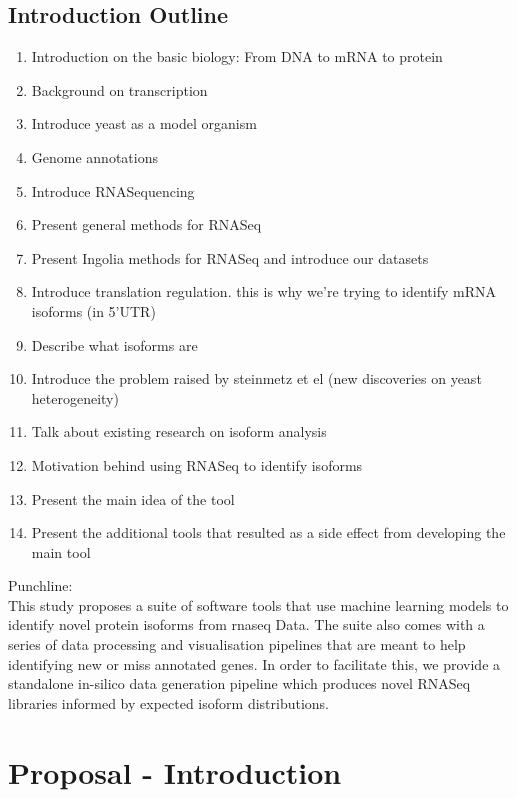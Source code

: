 \documentclass[12pt]{article}
\begin{document}
\subsection{Introduction Outline}
\begin{enumerate}
    \item Introduction on the basic biology: From DNA to mRNA to protein
    \item Background on transcription 
    \item Introduce yeast as a model organism
    \item Genome annotations
    \item Introduce RNASequencing
    \item Present general methods for RNASeq
    \item Present Ingolia methods for RNASeq and introduce our datasets
    \item Introduce translation regulation. this is why we're trying to identify mRNA isoforms (in 5'UTR)
    \item Describe what isoforms are 
    \item Introduce the problem raised by steinmetz et el (new discoveries on yeast heterogeneity) 
    \item Talk about existing research on isoform analysis 
    \item Motivation behind using RNASeq to identify isoforms
    \item Present the main idea of the tool
    \item Present  the additional tools that resulted as a side effect from developing the main tool

\end{enumerate}

Punchline: \\

This study proposes a suite of software tools that use machine learning models to identify novel protein isoforms from \gls{rnaseq} Data. The suite also comes with a series of data processing and visualisation pipelines that are meant to help identifying new or miss annotated genes. In order to facilitate this, we provide a standalone in-silico data generation pipeline which produces novel RNASeq libraries informed by expected isoform distributions. 


\section{Proposal - Introduction}
\end{document}
